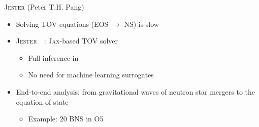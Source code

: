 \documentclass[usenames,dvipsnames,t]{beamer}
\newcommand{\ghlink}[1]{\href{https://github.com/#1}{\textcolor{black}{\faGithub}}}
\begin{document}
\begin{frame}{\textsc{Jester} \small (Peter T.H. Pang) \normalsize}
  \def\x{2mm}

  \begin{itemize}


    \item Solving TOV equations (EOS $\rightarrow$ NS) is slow

    \vspace{\x}

    \item<2-> \textsc{Jester}~\ghlink{nuclear-multimessenger-astronomy/jester}~\cite{Wouters:2025zju}: \textsc{Jax}-based TOV solver
    \begin{itemize}
      \item Full inference in 
      \item No need for machine learning surrogates
    \end{itemize}

    \vspace{\x}

    \item<3-> End-to-end analysis: from gravitational waves of neutron star mergers to the equation of state
    \begin{itemize}
      \item Example: 20 BNS in O5
    \end{itemize}
  \end{itemize}

  \vspace{-3mm}


\end{frame}
\end{document}
